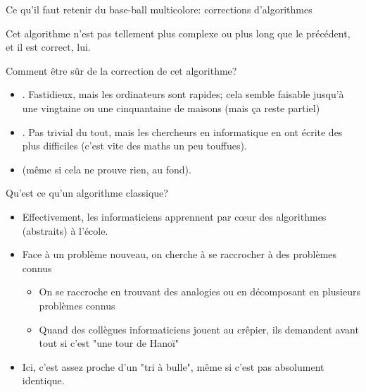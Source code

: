 \documentclass[final,hyperref={pdfpagelabels=false}]{beamer}
\begin{document}
\begin{frame}{Ce qu'il faut retenir du base-ball multicolore: corrections d'algorithmes}

  Cet algorithme n'est pas tellement plus complexe ou plus long que le
  précédent, et il est correct, lui.

  \begin{block}{Comment être sûr de la \alert{correction} de cet algorithme?}
    \begin{itemize}
    \item {}. Fastidieux, mais les
      ordinateurs sont rapides; cela semble faisable jusqu'à une vingtaine ou
      une cinquantaine de maisons (mais ça reste partiel)
    \item {}. Pas trivial
      du tout, mais les chercheurs en informatique en ont écrite des plus
      difficiles (c'est vite des maths un peu touffues).
    \item {} (même
      si cela ne prouve rien, au fond).
    \end{itemize}
  \end{block}

  \begin{block}{Qu'est ce qu'un \alert{algorithme classique}?}
    \begin{itemize}
    \item Effectivement, les informaticiens apprennent par cœur des algorithmes
      (abstraits) à l'école.
    \item Face à un problème nouveau, on cherche à se raccrocher à des
      problèmes connus
      \begin{itemize}
      \item On se raccroche en trouvant des analogies ou en décomposant en
        plusieurs problèmes connus
      \item Quand des collègues informaticiens jouent au crêpier, ils demandent
        avant tout si c'est "une tour de Hanoï" 
      \end{itemize}
    \item Ici, c'est assez proche d'un "tri à bulle", même si c'est pas
      absolument identique.
    \end{itemize}
  \end{block}


\end{frame}
\end{document}
